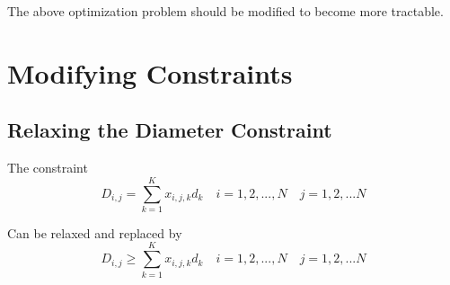\documentclass[12pt]{article}
\begin{document}
	
	The above optimization problem should be modified to become more tractable.
	
	\section{Modifying Constraints}

	\subsection{Relaxing the Diameter Constraint}
	The constraint 
	\begin{equation}
	D_{i,j} = \sum_{k=1}^{K}x_{i,j,k}d_k \quad i = 1, 2, ..., N \quad j = 1, 2, ... N
	\end{equation}
	
	Can be relaxed and replaced by 
	\begin{equation}
	D_{i,j} \geq \sum_{k=1}^{K}x_{i,j,k}d_k \quad i = 1, 2, ..., N \quad j = 1, 2, ... N
	\end{equation}
	
\end{document}
